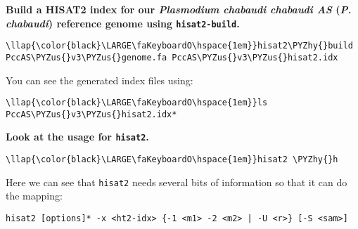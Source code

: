 \documentclass[11pt]{article}
\def\PYZus{\char`\_}
\def\PYZhy{\char`\-}
\begin{document}
    \textbf{Build a HISAT2 index for our \textit{Plasmodium chabaudi chabaudi
AS} (\textit{P. chabaudi}) reference genome using \texttt{hisat2-build}.}





\begin{terminalinput}
\begin{Verbatim}[commandchars=\\\{\}]
\llap{\color{black}\LARGE\faKeyboardO\hspace{1em}}hisat2\PYZhy{}build PccAS\PYZus{}v3\PYZus{}genome.fa PccAS\PYZus{}v3\PYZus{}hisat2.idx
\end{Verbatim}
\end{terminalinput}



    You can see the generated index files using:





\begin{terminalinput}
\begin{Verbatim}[commandchars=\\\{\}]
\llap{\color{black}\LARGE\faKeyboardO\hspace{1em}}ls PccAS\PYZus{}v3\PYZus{}hisat2.idx*
\end{Verbatim}
\end{terminalinput}



    \textbf{Look at the usage for \texttt{hisat2}.}





\begin{terminalinput}
\begin{Verbatim}[commandchars=\\\{\}]
\llap{\color{black}\LARGE\faKeyboardO\hspace{1em}}hisat2 \PYZhy{}h
\end{Verbatim}
\end{terminalinput}



    Here we can see that \texttt{hisat2} needs several bits of information
so that it can do the mapping:

\begin{verbatim}
hisat2 [options]* -x <ht2-idx> {-1 <m1> -2 <m2> | -U <r>} [-S <sam>]
\end{verbatim}
\end{document}
